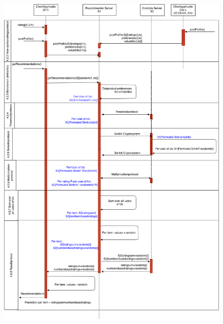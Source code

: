 \begin{center}
\begin{figure}[htpb]   
    \label{Figuur::hoofdprotocol}      
   
\centering\includegraphics[width=1.0\textwidth,keepaspectratio]{fig/hoofdprotocol_privacy}    
   
   \end{figure}
   \end{center}

